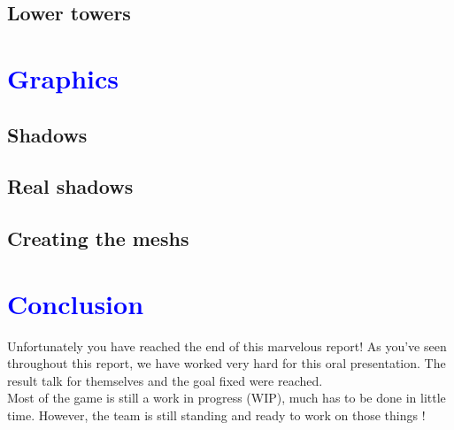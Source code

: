 \documentclass[article]{report}             %
\begin{document}
			\section{Lower towers}
		\chapter{\textcolor{blue}{Graphics}}
			\section{Shadows}
			\section{Real shadows}
			\section{Creating the meshs}
		
		\chapter{\textcolor{blue}{Conclusion}}
			Unfortunately you have reached the end of this marvelous report! As you've seen throughout this report, we have worked very hard for this oral presentation. The result talk for themselves and the goal fixed were reached.\\
			
			Most of the game is still a work in progress (WIP), much has to be done in little time. However, the team is still standing and ready to work on those things !
			
			
\end{document}
